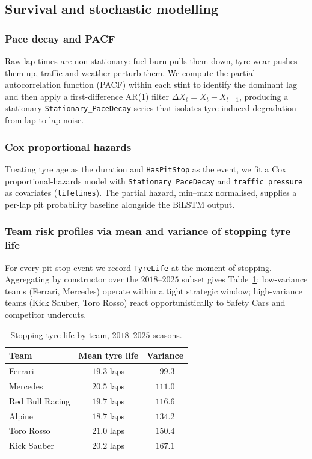 \documentclass[11pt,a4paper]{article}
\newcommand{\code}[1]{\texttt{\small #1}}
\theoremstyle{remark}
\begin{document}
\subsection{Survival and stochastic modelling}
\subsubsection{Pace decay and PACF}
Raw lap times are non-stationary: fuel burn pulls them down, tyre
wear pushes them up, traffic and weather perturb them. We compute the
partial autocorrelation function (PACF) within each stint to identify
the dominant lag and then apply a first-difference AR(1) filter
$\Delta X_t = X_t - X_{t-1}$, producing a stationary
\code{Stationary\_PaceDecay} series that isolates tyre-induced
degradation from lap-to-lap noise.

\subsubsection{Cox proportional hazards}
Treating tyre age as the duration and \code{HasPitStop} as the event,
we fit a Cox proportional-hazards model with
\code{Stationary\_PaceDecay} and \code{traffic\_pressure} as
covariates (\code{lifelines}). The partial hazard, min--max
normalised, supplies a per-lap pit probability baseline alongside
the BiLSTM output.

\subsubsection{Team risk profiles via mean and variance of stopping tyre life}
For every pit-stop event we record \code{TyreLife} at the moment of
stopping. Aggregating by constructor over the $2018$--$2025$ subset
gives Table~\ref{tab:team-risk}: low-variance teams (Ferrari,
Mercedes) operate within a tight strategic window; high-variance
teams (Kick Sauber, Toro Rosso) react opportunistically to Safety
Cars and competitor undercuts.

\begin{table}[H]
  \centering
  \caption{Stopping tyre life by team, $2018$--$2025$ seasons.}
  \label{tab:team-risk}
  \begin{tabular}{lcc}
    \toprule
    Team & Mean tyre life & Variance \\
    \midrule
    Ferrari         & $19.3$ laps & $\phantom{0}99.3$ \\
    Mercedes        & $20.5$ laps & $111.0$ \\
    Red Bull Racing & $19.7$ laps & $116.6$ \\
    Alpine          & $18.7$ laps & $134.2$ \\
    Toro Rosso      & $21.0$ laps & $150.4$ \\
    Kick Sauber     & $20.2$ laps & $167.1$ \\
    \bottomrule
  \end{tabular}
\end{table}
\end{document}
